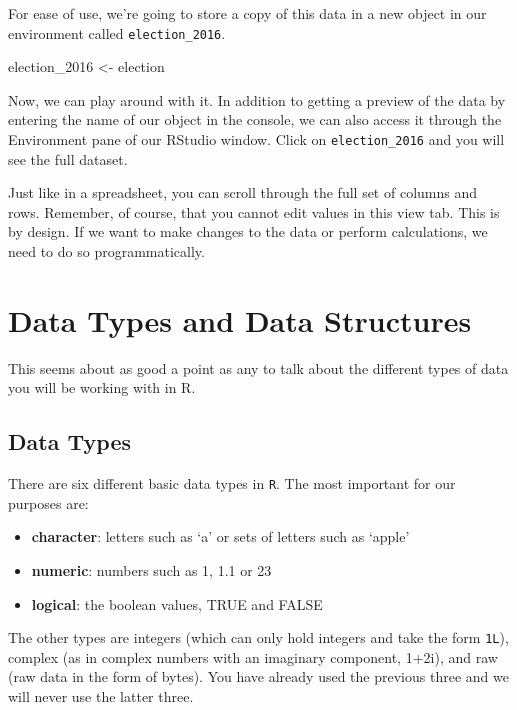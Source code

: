 \documentclass[
]{book}
\newenvironment{Shaded}{\begin{snugshade}}{\end{snugshade}}
\newcommand{\NormalTok}[1]{#1}
\newcommand{\OtherTok}[1]{\textcolor[rgb]{0.56,0.35,0.01}{#1}}
\providecommand{\tightlist}{%
  \setlength{\itemsep}{0pt}\setlength{\parskip}{0pt}}
\begin{document}
For ease of use, we're going to store a copy of this data in a new object in our environment called \texttt{election\_2016}.

\begin{Shaded}
\begin{Highlighting}[]
\NormalTok{election\_2016 }\OtherTok{\textless{}{-}}\NormalTok{ election}
\end{Highlighting}
\end{Shaded}

Now, we can play around with it. In addition to getting a preview of the data by entering the name of our object in the console, we can also access it through the Environment pane of our RStudio window. Click on \texttt{election\_2016} and you will see the full dataset.

Just like in a spreadsheet, you can scroll through the full set of columns and rows. Remember, of course, that you cannot edit values in this view tab. This is by design. If we want to make changes to the data or perform calculations, we need to do so programmatically.

\hypertarget{data-types-and-data-structures}{%
\section{Data Types and Data Structures}\label{data-types-and-data-structures}}

This seems about as good a point as any to talk about the different types of data you will be working with in R.

\hypertarget{data-types}{%
\subsection{Data Types}\label{data-types}}

There are six different basic data types in \texttt{R}. The most important for our purposes are:

\begin{itemize}
\tightlist
\item
  \textbf{character}: letters such as `a' or sets of letters such as `apple'
\item
  \textbf{numeric}: numbers such as 1, 1.1 or 23
\item
  \textbf{logical}: the boolean values, TRUE and FALSE
\end{itemize}

The other types are integers (which can only hold integers and take the form \texttt{1L}), complex (as in complex numbers with an imaginary component, 1+2i), and raw (raw data in the form of bytes). You have already used the previous three and we will never use the latter three.
\end{document}
